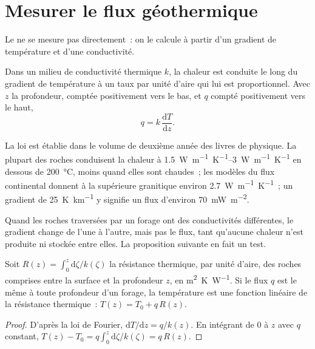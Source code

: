 \section{Mesurer le flux géothermique}

Le  ne se mesure pas directement~: on le calcule à partir d'un
gradient de température et d'une conductivité.

\begin{proposition}\label{prop:b1:heat-budget:fourier}
Dans un milieu de conductivité thermique $k$, la chaleur est conduite le long du
gradient de température à un taux par unité d'aire qui lui est proportionnel. Avec
$z$ la profondeur, comptée positivement vers le bas, et $q$ compté positivement
vers le haut,
\[
  q = k\,\frac{\mathrm dT}{\mathrm dz} .
\]
\end{proposition}
\admitted

La loi est établie dans le volume de deuxième année des livres de physique. La
plupart des roches conduisent la chaleur à \qtyrange{1.5}{3}{W.m^{-1}.K^{-1}} en
dessous de \qty{200}{\celsius}, moins quand elles sont chaudes~; les modèles du
flux continental donnent à la  supérieure granitique environ
\qty{2.7}{W.m^{-1}.K^{-1}}~;
un gradient de \qty{25}{K.km^{-1}} y signifie un flux d'environ
\qty{70}{mW.m^{-2}}.

Quand les roches traversées par un forage ont des conductivités différentes, le
gradient change de l'une à l'autre, mais pas le flux, tant qu'aucune chaleur
n'est produite ni stockée entre elles. La proposition suivante en fait un test.

\begin{proposition}\label{prop:b1:heat-budget:bullard}
Soit $R(z) = \int_0^z \mathrm d\zeta/k(\zeta)$ la résistance thermique, par unité
d'aire, des roches comprises entre la surface et la profondeur $z$, en
\unit{m^2.K.W^{-1}}. Si le flux $q$ est le même à toute profondeur d'un forage,
la température est une fonction linéaire de la résistance thermique~:
$T(z) = T_0 + q\,R(z)$.
\end{proposition}

\begin{proof}
D'après la loi de Fourier, $\mathrm dT/\mathrm dz = q/k(z)$. En intégrant de $0$ à
$z$ avec $q$ constant, $T(z) - T_0 = q\int_0^z \mathrm d\zeta/k(\zeta) = q\,R(z)$.
\end{proof}

